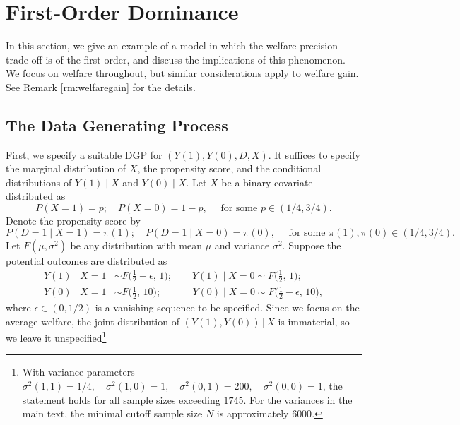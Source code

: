 \documentclass[12pt]{article}
\numberwithin{equation}{section}
\theoremstyle{plain}                         %
\theoremstyle{definition}                  %
\theoremstyle{remark}                      %
\begin{document}
\section{First-Order Dominance}
\label{sec:example}

In this section, we give an example of a model in which the welfare-precision trade-off is of the first order, and discuss the implications of this phenomenon. We focus on welfare throughout, but similar considerations apply to welfare gain. See Remark \ref{rm:welfaregain} for the details.
 
\subsection{The Data Generating Process}
\label{sec:dgp}

First, we specify a suitable DGP for $(Y(1), Y(0), D, X)$. It suffices to specify the marginal distribution of $X$, the propensity score, and the conditional distributions of $Y(1) \mid X$ and $Y(0) \mid X$. Let $X$ be a binary covariate distributed as
\begin{equation*}
    P (X=1) =p; \quad P (X=0) =1-p, \quad \text{ for some } p \in (1/4, 3/4).
\end{equation*}
Denote the propensity score by
$$
P (D=1 \mid X=1) = \pi(1); \quad P (D=1 \mid X=0) = \pi(0), \quad \text{ for some } \pi(1), \pi(0) \in (1/4, 3/4).
$$
Let $F(\mu, \sigma^2)$ be any distribution with mean $\mu$ and variance $\sigma^2$. Suppose the potential outcomes are distributed as 
\begin{align}
\label{eq:line2}
Y(1)\mid X=1 &\sim F\bigl(\tfrac12-\epsilon,\,1\bigr); 
\qquad
Y(1)\mid X=0 \sim F\bigl(\tfrac12,\,1\bigr); 
\\ \label{eq:dgp}
Y(0) \mid X=1 &\sim F\bigl(\tfrac12,\,10 \bigr); 
 \qquad \quad \,
Y(0) \mid X=0 \sim F\bigl(\tfrac12-\epsilon,\,10 \bigr),
\end{align}
where $\epsilon \in (0, 1/2)$ is a vanishing sequence to be specified. Since we focus on the average welfare, the joint distribution of $(Y(1), Y(0)) \,|\, X$ is immaterial, so we leave it unspecified\footnote{ With variance parameters $\sigma^2(1,1) = 1/4, \quad \sigma^2 (1,0)=1, \quad \sigma^2(0,1) = 200, \quad \sigma^2(0,0) = 1$, the statement holds for all sample sizes exceeding  $1745$. For the variances in the main text, the minimal cutoff sample size $N$ is approximately $6 000$.}
\end{document}
